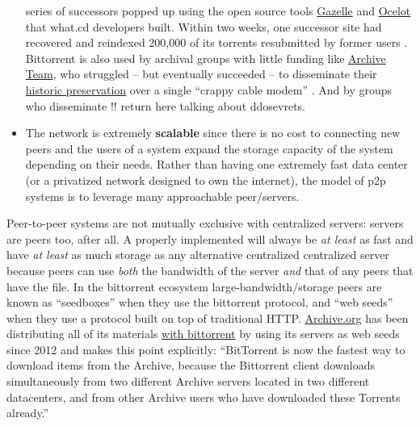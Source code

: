 \documentclass[10pt]{article}
\begin{document}
\begin{multicols}{2}
\begin{itemize}
  series of successors popped up using the open source tools
  \href{https://github.com/WhatCD/Gazelle}{Gazelle} and
  \href{https://github.com/WhatCD/Ocelot}{Ocelot} that what.cd
  developers built. Within two weeks, one successor site had recovered
  and reindexed 200,000 of its torrents resubmitted by former users \cite{vandersarWhatCdDead2016} . Bittorrent is also used by archival
  groups with little funding like
  \href{https://wiki.archiveteam.org/index.php/Main_Page}{Archive Team},
  who struggled -- but eventually succeeded -- to disseminate their
  \href{https://wiki.archiveteam.org/index.php/GeoCities_Project}{historic
  preservation} over a single ``crappy cable modem'' \cite{scottGeocitiesTorrentUpdate2010} . And by groups who disseminate !!
  return here talking about ddosevrets.
\item
  The network is extremely \textbf{scalable} since there is no cost to
  connecting new peers and the users of a system expand the storage
  capacity of the system depending on their needs. Rather than having
  one extremely fast data center (or a privatized network designed to
  own the internet), the model of p2p systems is to leverage many
  approachable peer/servers.
\end{itemize}

Peer-to-peer systems are not mutually exclusive with centralized
servers: servers are peers too, after all. A properly implemented will
always be \emph{at least} as fast and have \emph{at least} as much
storage as any alternative centralized centralized server because peers
can use \emph{both} the bandwidth of the server \emph{and} that of any
peers that have the file. In the bittorrent ecosystem
large-bandwidth/storage peers are known as ``seedboxes''\cite{rossiPeekingBitTorrentSeedbox2014}  when they use the bittorrent
protocol, and ``web seeds''\cite{hoffmanHTTPBasedSeedingSpecification}  when they use a protocol built
on top of traditional HTTP. \href{https://archive.org}{Archive.org} has
been distributing all of its materials
\href{https://archive.org/details/bittorrent}{with bittorrent} by using
its servers as web seeds since 2012 and makes this point explicitly:
``BitTorrent is now the fastest way to download items from the Archive,
because the Bittorrent client downloads simultaneously from two
different Archive servers located in two different datacenters, and from
other Archive users who have downloaded these Torrents already.'' \cite{kahle000000Torrents2012} 


\end{multicols}
\end{document}
